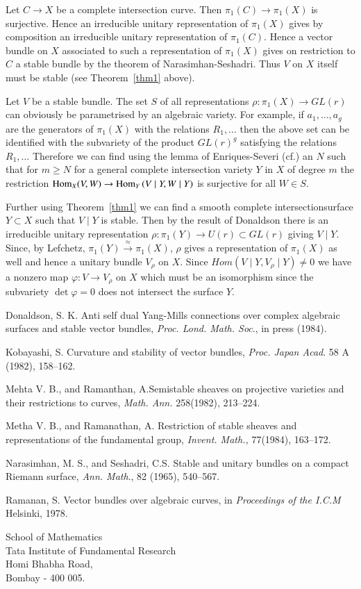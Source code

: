 \begin{Proof}
Let $C\to X$ be a complete intersection curve. Then $\pi_1(C)\to \pi_1(X)$ is surjective. Hence an irreducible unitary representation of $\pi_1(X)$ gives by composition an irreducible unitary representation of $\pi_1(C)$. Hence a vector bundle on $X$ associated to such a representation of $\pi_1(X)$ gives on restriction to $C$ a stable bundle by the theorem of Narasimhan-Seshadri. Thus $V$ on $X$ itself must be stable (see Theorem~\ref{thm1} above). 

Let $V$ be a stable bundle. The set $S$ of all representations $\rho:\pi_1(X)\to GL(r)$ can obviously be parametrised by an algebraic variety. For example, if $a_1,\ldots,a_g$ are the generators of $\pi_1(X)$ with the relations $R_1,\ldots$ then the above set can be identified with the subvariety of the product $GL(r)^{g}$ satisfying the relations $R_1,\ldots$ Therefore we can find using the lemma of Enriques-Severi (cf.\cite{key3}) an $N$ such that for $m\geq N$ for a general complete intersection variety $Y$ in $X$ of degree $m$ the restriction $\mathrm{Hom}_X(V,W)\to \mathrm{Hom}_Y\left(V\mid Y, W\mid Y\right)$ is surjective for all $W\in S$. 

Further using Theorem~\ref{thm1} we can find a smooth complete intersection\pageoriginale surface $Y\subset X$ such that $V\mid Y$ is stable. Then by the result of Donaldson there is an irreducible unitary representation $\rho:\pi_1(Y)\to U(r)\subset GL(r)$ giving $V\mid Y$. Since, by Lefchetz, $\pi_1(Y)\xrightarrow{\approx}\pi_1(X)$, $\rho$ gives a representation of $\pi_1(X)$ as well and hence a unitary bundle $V_{\rho}$ on $X$. Since $Hom \left(V\mid Y, V_{\rho}\mid Y\right)\neq 0$ we have a nonzero map $\varphi:V\to V_{\rho}$ on $X$ which must be an isomorphism since the subvariety $\det\varphi=0$ does not intersect the surface $Y$. 
\end{Proof}


\begin{thebibliography}{99}
Donaldson, S. K. Anti self dual Yang-Mills connections over complex algebraic surfaces and stable vector bundles, \textit{Proc. Lond. Math. Soc}., in press (1984).

Kobayashi, S. Curvature and stability of vector bundles, \textit{Proc. Japan Acad}. 58 A (1982), 158--162.

Mehta V. B., and  Ramanthan, A.\pageoriginale Semistable sheaves on projective varieties and their restrictions to curves, \textit{Math. Ann.} 258(1982), 213--224.

Metha V. B., and  Ramanathan, A. Restriction of stable sheaves and representations of the fundamental group, \textit{Invent. Math.,} 77(1984), 163--172.

Narasimhan, M. S., and Seshadri, C.S. Stable and unitary bundles on a compact Riemann surface, \textit{Ann. Math}., 82 (1965), 540--567.

Ramanan, S. Vector bundles over algebraic curves, in \textit{Proceedings of the I.C.M} Helsinki, 1978.
\end{thebibliography}

\vskip 1cm

\noindent
School of Mathematics\\
Tata Institute of Fundamental Research\\
Homi Bhabha Road,\\
Bombay - 400 005.

\newpage
~\phantom{a}
\thispagestyle{empty}
